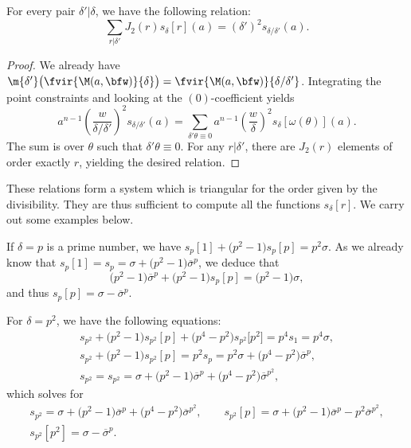 \begin{lem}\label{lem-relation-sdelta}
For every pair $\delta'|\delta$, we have the following relation:
\[ \sum_{r|\delta'}J_2(r)s_\delta[r](a) = (\delta')^2s_{\delta/\delta'}(a). \]
\end{lem}

\begin{proof}
We already have $\m{\delta'}\bigl(\fvir{\M(a,\bfw)}{\delta}\bigr)=\fvir{\M(a,\bfw)}{\delta/\delta'}$. Integrating the point constraints and looking at the $(0)$-coefficient yields
\[ a^{n-1}\left(\frac{w}{\delta/\delta'}\right)^2 s_{\delta/\delta'}(a) = \sum_{\delta'\theta\equiv 0}a^{n-1}\left(\frac{w}{\delta}\right)^2s_\delta[\omega(\theta)](a). \]
The sum is over $\theta$ such that $\delta'\theta\equiv 0$. For any $r|\delta'$, there are $J_2(r)$ elements of order exactly $r$, yielding the desired relation.
\end{proof}

These relations form a system which is triangular for the order given by the divisibility. They are thus sufficient to compute all the functions $s_\delta[r]$. We carry out some examples below.

\begin{expl}
If $\delta=p$ is a prime number, we have
$s_p[1]+\bigl(p^2-1\bigr)s_p[p] =p^2\sigma$.
As we already know that $s_p[1]=s_p=\sigma+\bigl(p^2-1\bigr)\overline{\sigma}^p$, we deduce that
\[ \bigl(p^2-1\bigr)\overline{\sigma}^p+\bigl(p^2-1\bigr)s_p[p] = \bigl(p^2-1\bigr)\sigma, \]
and thus
$s_p[p]=\sigma-\overline{\sigma}^p$.
\end{expl}

\begin{expl}
For $\delta=p^2$, we have the following equations:
\begin{gather*}
 s_{p^2}+\bigl(p^2-1\bigr)s_{p^2}[p]+\bigl(p^4-p^2\bigr)s_{p^2}\big[p^2\big] = p^4s_1 =p^4\sigma, \\
 s_{p^2}+\bigl(p^2-1\bigr)s_{p^2}[p] = p^2s_p =p^2\sigma+\bigl(p^4-p^2\bigr)\overline{\sigma}^p, \\
 s_{p^2} = s_{p^2} = \sigma+\bigl(p^2-1\bigr)\overline{\sigma}^p+\bigl(p^4-p^2\bigr)\overline{\sigma}^{p^2},
 \end{gather*}
 which solves for
\begin{gather*}
 s_{p^2} = \sigma+\bigl(p^2-1\bigr)\overline{\sigma}^p+\bigl(p^4-p^2\bigr)\overline{\sigma}^{p^2}, \qquad
 s_{p^2}[p] = \sigma+\bigl(p^2-1\bigr)\overline{\sigma}^p -p^2\overline{\sigma}^{p^2}, \\
 s_{p^2}[p^2] = \sigma-\overline{\sigma}^p.
 \end{gather*}
\end{expl}

